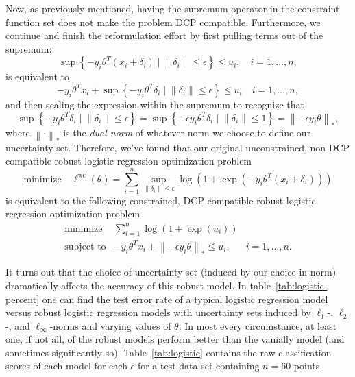 \documentclass[12pt,reqno]{article}
\theoremstyle{definition}
\numberwithin{equation}{section}
\begin{document}
Now, as previously mentioned, having the supremum operator in the constraint function set does not
make the problem DCP compatible. Furthermore, we continue and finish the reformulation effort by first
pulling terms out of the supremum:
\[\sup \left\{-y_i \theta^T\left(x_i+\delta_i\right) \mid \left\lVert \delta_i \right\rVert \le \epsilon \right\} \le u_i, \quad i = 1, \ldots, n,\]
is equivalent to
\[-y_i\theta^Tx_i + \sup \left\{ -y_i \theta^T \delta_i \mid \left\lVert \delta_i \right\rVert \le \epsilon \right\} \le u_i \quad i = 1, \ldots, n,\]
and then scaling the expression within the supremum
to recognize that 
\[\sup \left\{ -y_i \theta^T \delta_i \mid \left\lVert \delta_i \right\rVert \le \epsilon \right\} = \sup \left\{ -\epsilon y_i \theta^T \delta_i \mid \left\lVert \delta_i \right\rVert \le 1 \right\} = \left\lVert -\epsilon y_i \theta \right\rVert_{*},\]
where $\left\lVert \cdot \right\rVert_{*}$ is the \textit{dual norm} of whatever norm we choose to define our uncertainty set.
Therefore, we've found that our original unconstrained, non-DCP compatible robust logistic regression optimization problem
\[\mathrm{minimize} \quad \ell^{\mathrm{wc}}(\theta)=\sum_{i=1}^n \sup _{\left\|\delta_i\right\| \leq \epsilon} \log \left(1+\exp \left(-y_i \theta^T\left(x_i+\delta_i\right)\right)\right)\]
is equivalent to the following constrained, DCP compatible robust logistic regression optimization problem
\[\begin{array}{lll}
    \text{minimize} \; & \sum_{i=1}^n \log \left(1+\exp \left(u_i\right)\right) & \\
    \text{subject to} & -y_i\theta^Tx_i + \left\lVert -\epsilon y_i \theta \right\rVert_{*} \le u_i, \; & i = 1, \ldots, n.
    \end{array}\]

\noindent It turns out that the choice of uncertainty set (induced by our choice in norm) dramatically affects the accuracy of this robust model.
In table~\ref{tab:logistic-percent} one can find the test error rate of a typical logistic regression model versus
robust logistic regression models with uncertainty sets induced by $\ell_1$-, $\ell_2$-, and $\ell_\infty$-norms
and varying values of $\theta$. In most every circumstance, at least one, if not all, of the robust models perform
better than the vanially model (and sometimes significantly so). Table~\ref{tab:logistic} contains the raw
classification scores of each model for each $\epsilon$ for a test data set containing $n=60$ points.
\end{document}
